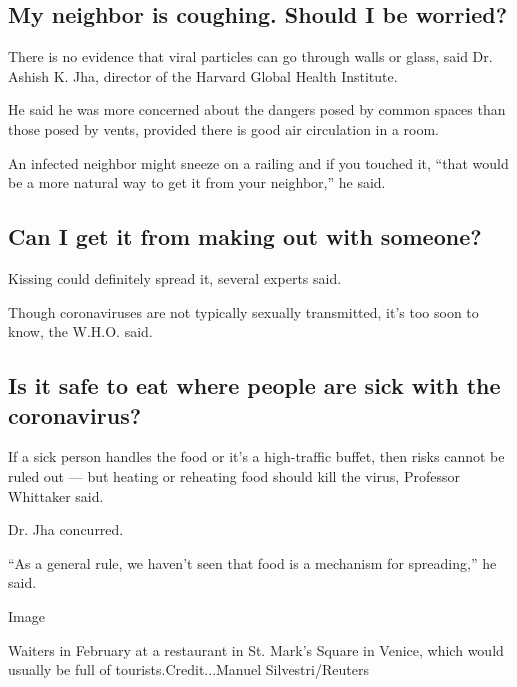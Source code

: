 \hypertarget{my-neighbor-is-coughing-should-i-be-worried}{%
\subsection{My neighbor is coughing. Should I be
worried?}\label{my-neighbor-is-coughing-should-i-be-worried}}

There is no evidence that viral particles can go through walls or glass,
said Dr. Ashish K. Jha, director of the Harvard Global Health Institute.

He said he was more concerned about the dangers posed by common spaces
than those posed by vents, provided there is good air circulation in a
room.

An infected neighbor might sneeze on a railing and if you touched it,
``that would be a more natural way to get it from your neighbor,'' he
said.

\hypertarget{can-i-get-it-from-making-out-with-someone}{%
\subsection{Can I get it from making out with
someone?}\label{can-i-get-it-from-making-out-with-someone}}

Kissing could definitely spread it, several experts said.

Though coronaviruses are not typically sexually transmitted, it's too
soon to know, the W.H.O. said.

\hypertarget{is-it-safe-to-eat-where-people-are-sick-with-the-coronavirus}{%
\subsection{Is it safe to eat where people are sick with the
coronavirus?}\label{is-it-safe-to-eat-where-people-are-sick-with-the-coronavirus}}

If a sick person handles the food or it's a high-traffic buffet, then
risks cannot be ruled out --- but heating or reheating food should kill
the virus, Professor Whittaker said.

Dr. Jha concurred.

``As a general rule, we haven't seen that food is a mechanism for
spreading,'' he said.

Image

Waiters in February at a restaurant in St. Mark's Square in Venice,
which would usually be full of tourists.Credit...Manuel
Silvestri/Reuters

